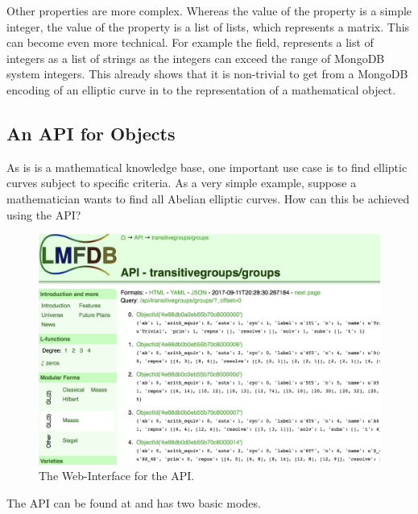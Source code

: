 Other properties are more complex.
Whereas the value of the  property is a simple integer, the value of
the  property is a list of lists, which represents a matrix. 
This can become even more technical. 
For example the  field, \lmfdb represents
a list of integers as a list of strings as the integers can exceed the range of MongoDB system
integers.  This already shows that it is non-trivial to get from a MongoDB encoding of an elliptic
curve in \lmfdb to the representation of a mathematical object. 


\subsection{An API for  \lmfdb Objects}\label{sec:sota:api}

As \lmfdb is is a mathematical knowledge base, one important use case is to find elliptic
curves subject to specific criteria. As a very simple example, suppose a mathematician
wants to find all Abelian elliptic curves.  How can this be achieved using the \lmfdb API?

\begin{figure}[h]
  \begin{center}
    \includegraphics[width=\textwidth]{APIScreenshot.png}
  \end{center}

  \caption[The Web-Interface for the \lmfdb API. ]{
    The Web-Interface for the \lmfdb API. 
  }
  \label{fig:apiscreenshot}
\end{figure}
The \lmfdb API can be found at  and has two basic modes. 

